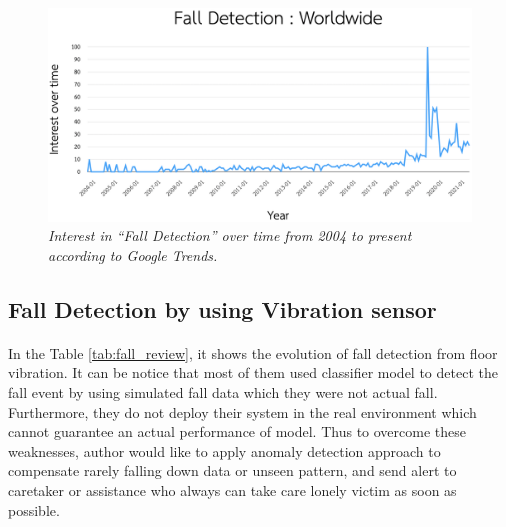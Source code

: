 \begin{figure}[H]
  \centering
  \caption[Fall detection trends]{\emph{Interest in “Fall Detection” over time from 2004 to present according to Google Trends.}}\label{fig:fall_trend}
  \includegraphics[width=\textwidth]{figures/fall_trend.png}  
\end{figure}

\subsection{Fall Detection by using Vibration sensor}
\paragraph{}
In the Table \ref{tab:fall_review}, it shows the evolution of fall detection from floor vibration. It can be notice that most of them used classifier model to detect the fall event by using simulated fall data which they were not actual fall. Furthermore, they do not deploy their system in the real environment which cannot guarantee an actual performance of model. Thus to overcome these weaknesses, author would like to apply anomaly detection approach to compensate rarely falling down data or unseen pattern, and send alert to caretaker or assistance who always can take care lonely victim as soon as possible.

